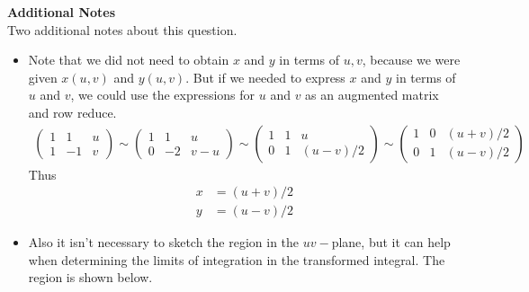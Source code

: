 {    \textbf{Additional Notes}\\
    Two additional notes about this question. 
    \begin{itemize}
        \item Note that we did not need to obtain $x$ and $y$ in terms of $u,v$, because we were given $x(u,v)$ and $y(u,v)$. But if we needed to express $x$ and $y$ in terms of $u$ and $v$, we could use the expressions for $u$ and $v$ as an augmented matrix and row reduce. 
    \begin{align}
        \begin{pmatrix} 1 & 1 & u \\1 & -1 & v\end{pmatrix} 
        \sim \begin{pmatrix} 1 & 1 & u \\0 & -2 & v - u\end{pmatrix} 
        \sim \begin{pmatrix} 1 & 1 & u \\0 & 1 & (u - v)/2\end{pmatrix} 
        \sim \begin{pmatrix} 1 & 0 & (u + v)/2 \\0 & 1 & (u - v)/2\end{pmatrix} 
    \end{align}
    Thus
    \begin{align}
        x &=  (u + v)/2\\
        y &= (u - v)/2
    \end{align}
    \item Also it isn't necessary to sketch the region in the $uv-$plane, but it can help when determining the limits of integration in the transformed integral. The region is shown below. 
    \begin{center}     
    \end{center}     
    \end{itemize}
    
    
    }
   \else

